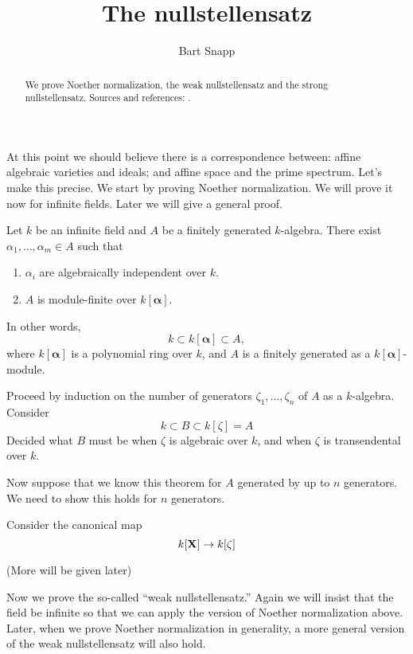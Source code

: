 \documentclass{ximera}
\author{Bart Snapp}
\title{The nullstellensatz}
\begin{document}
\begin{abstract}
  We prove Noether normalization, the weak nullstellensatz and the
  strong nullstellensatz. Sources and references:
  \cite{dE1995,hM1986,mR1995}.
\end{abstract}
\maketitle


At this point we should believe there is a correspondence between:
affine algebraic varieties and ideals; and affine space and the prime
spectrum. Let's make this precise. We start by proving Noether
normalization. We will prove it now for infinite fields. Later we will
give a general proof.

\begin{theorem}
  Let $k$ be an infinite field and $A$ be a finitely generated
  $k$-algebra. There exist $\alpha_1,\dots,\alpha_m\in A$ such that
  \begin{enumerate}
  \item $\alpha_i$ are algebraically independent over $k$.
  \item $A$ is module-finite over $k[\boldsymbol{\alpha}]$.
  \end{enumerate}
  In other words, 
  \[
  k\subset k[\boldsymbol{\alpha}] \subset A,
  \]
  where $k[\boldsymbol{\alpha}]$ is a polynomial ring over $k$, and
  $A$ is a finitely generated as a $k[\boldsymbol{\alpha}]$-module.
  \begin{sketch}
    Proceed by induction on the number of generators
    $\zeta_1,\dots,\zeta_n$ of $A$ as a $k$-algebra. Consider
    \[
    k \subset B \subset k[\zeta] = A
    \]
    Decided what $B$ must be when $\zeta$ is algebraic over $k$, and
    when $\zeta$ is transendental over $k$.

    Now suppose that we know this theorem for $A$ generated by up to
    $n$ generators. We need to show this holds for $n$ generators.

    Consider the canonical map
    \[
    k[\mathbf X] \to k[\zeta]
    \]


    (More will be given later)
  \end{sketch}
\end{theorem}


Now we prove the so-called ``weak nullstellensatz.'' Again we will
insist that the field be infinite so that we can apply the version of
Noether normalization above. Later, when we prove Noether
normalization in generality, a more general version of the weak
nullstellensatz will also hold.
\end{document}

